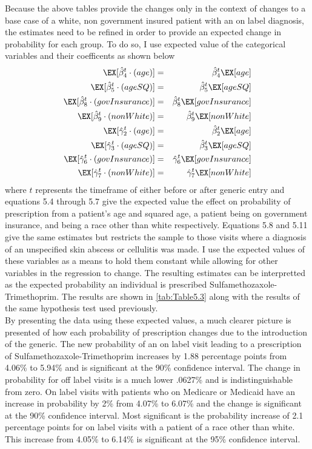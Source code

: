 
\newpage
Because the above tables provide the changes only in the context of changes to a base case of a white, non government insured patient with an on label diagnosis, the estimates need to be refined in order to provide an expected change in probability for each group. To do so, I use expected value of the categorical variables and their coefficents as shown below
\begin{eqnarray}
    \EX[\hat{\beta}_4^t\cdot(age)] &=& \hat{\beta}_4^t\EX[age]\\
    \EX[\hat{\beta}_5^t\cdot(ageSQ)] &=& \hat{\beta}_5^t\EX[ageSQ]\\
    \EX[\hat{\beta}_8^t\cdot(govInsurance)] &=& \hat{\beta}_8^t\EX[govInsurance]\\
    \EX[\hat{\beta}_9^t\cdot(nonWhite)] &=& \hat{\beta}_9^t\EX[nonWhite]\\
    \EX[\hat{\gamma}_2^t\cdot(age)] &=& \hat{\beta}_2^t\EX[age]\\
    \EX[\hat{\gamma}_3^t\cdot(ageSQ)] &=& \hat{\beta}_3^t\EX[ageSQ]\\
    \EX[\hat{\gamma}_6^t\cdot(govInsurance)] &=& \hat{\gamma}_6^t\EX[govInsurance]\\
    \EX[\hat{\gamma}_7^t\cdot(nonWhite)] &=& \hat{\gamma}_7^t\EX[nonWhite]
\end{eqnarray}
where $t$ represents the timeframe of either before or after generic entry and equations 5.4 through 5.7 give the expected value the effect on probability of prescription from a patient's age and squared age, a patient being on government insurance, and being a race other than white respectively. Equations 5.8 and 5.11 give the same estimates but restricts the sample to those visits where a diagnosis of an unspecified skin abscess or cellulitis was made. I use the expected values of these variables as a means to hold them constant while allowing for other variables in the regression to change. The resulting estimates can be interpretted as the expected probability an individual is prescribed Sulfamethozaxole-Trimethoprim. The results are shown in \autoref{tab:Table5.3} along with the results of the same hypothesis test used previously.\\
\indent By presenting the data using these expected values, a much clearer picture is presented of how each probability of prescription changes due to the introduction of the generic. The new probability of an on label visit leading to a prescription of Sulfamethozaxole-Trimethoprim increases by 1.88 percentage points from 4.06\% to 5.94\% and is significant at the 90\% confidence interval. The change in probability for off label visits is a much lower .0627\% and is indistinguishable from zero. On label visits with patients who on Medicare or Medicaid have an increase in probability by 2\% from 4.07\% to 6.07\% and the change is significant at the 90\% confidence interval. Most significant is the probability increase of 2.1 percentage points for on label visits with a patient of a race other than white. This increase from 4.05\% to 6.14\% is significant at the 95\% confidence interval.\\
